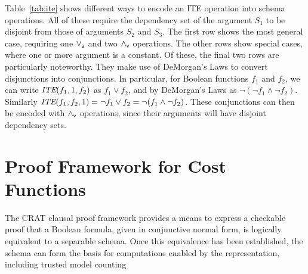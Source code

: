 \documentclass{llncs}
\newcommand{\pand}{\mathbin{\land_{\sf v}}}
\newcommand{\por}{\mathbin{\lor_{\sf a}}}
\newcommand{\tautology}{1}
\newcommand{\ite}{\mbox{\it ITE}}
\begin{document}
Table~\ref{tab:ite} shows different ways to encode an ITE operation
into schema operations.  All of these require the dependency set of
the argument $S_1$ to be disjoint from those of arguments $S_2$ and
$S_3$.  The first row shows the most general case, requiring one
$\por$ and two $\pand$ operations.  The other rows show special cases,
where one or more argument is a constant.  Of these, the final two
rows are particularly noteworthy.  They make use of DeMorgan's Laws to
convert disjunctions into conjunctions.  In particular, for Boolean
functions $f_1$ and $f_2$, we can write $\ite(f_1, \tautology, f_2)$
as $f_1 \lor f_2$, and by DeMorgan's Laws as $\neg(\neg f_1 \land
\neg f_2)$.  Similarly $\ite(f_1, f_2, \tautology) = \neg f_1 \lor f_2 = \neg(f_1 \land \neg f_2)$.
These conjunctions can then be
encoded with $\pand$ operations, since their arguments will have
disjoint dependency sets.

\section{Proof Framework for Cost Functions}

The CRAT clausal proof framework provides a means to express a
checkable proof that a Boolean formula, given in conjunctive normal
form, is logically equivalent to a separable schema.  Once this
equivalence has been established, the schema can form the basis
for computations enabled by the
representation, including trusted model counting 
\end{document}
